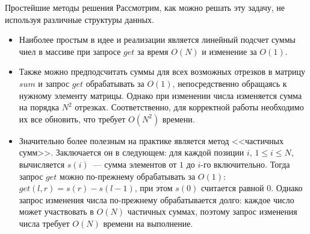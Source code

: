 ﻿\begin{section}{Простейшие методы решения}
Рассмотрим, как можно решать эту задачу, не используя различные структуры данных.
\begin{itemize}

\item Наиболее простым в идее и реализации является линейный подсчет суммы чиел в массиве
при запросе $get$ за время $O(N)$ и изменение за $O(1)$.

\item Также можно предподсчитать суммы для всех возможных отрезков в матрицу $sum$ 
и запрос $get$ обрабатывать за $O(1)$, непосредственно обращаясь к нужному элементу 
матрицы. Однако при изменении числа изменяется сумма на порядка $N^2$ отрезках.
Соответственно, для корректной работы необходимо их все обновить, что требует $O(N^2)$
времени.

\item Значительно более полезным на практике является метод <<частичных сумм>>.
Заключается он в следующем: для каждой позиции $i$, $1 \le i \le N$, вычисляется 
$s(i)$~--- сумма элементов от $1$ до $i$-го включительно. Тогда запрос $get$ можно
по-прежнему обрабатывать за $O(1)$: $get(l, r) = s(r) - s(l - 1)$, при этом $s(0)$ 
считается равной $0$. Однако запрос изменения числа по-прежнему обрабатывается
долго: каждое число может участвовать в $O(N)$ частичных суммах, поэтому 
запрос изменения числа требует $O(N)$ времени на выполнение.

\end{itemize}

\end{section}